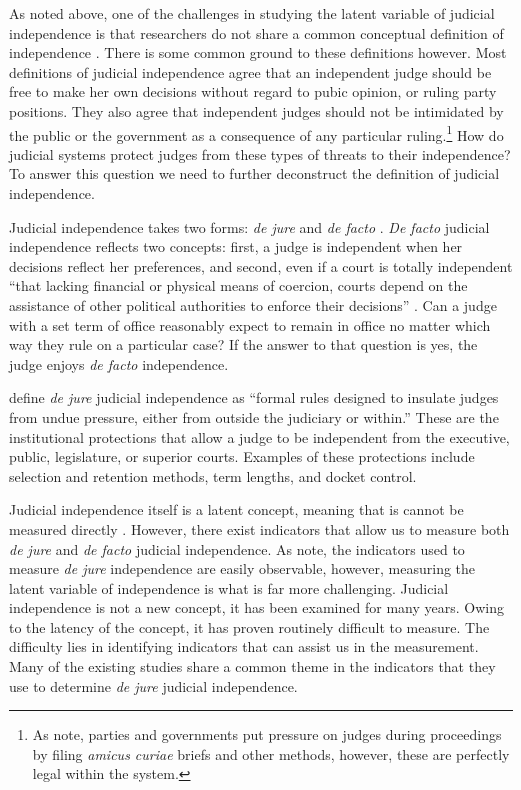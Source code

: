\documentclass[JohnsonMADraft2.tex]{subfiles}
\begin{document}
As noted above, one of the challenges in studying the latent variable of judicial independence is that researchers do not share a common conceptual definition of independence \citep{Linzer2014}.  There is some common ground to these definitions however.  Most definitions of judicial independence agree that an independent judge should be free to make her own decisions without regard to pubic opinion, or ruling party positions.  They also agree that independent judges should not be intimidated by the public or the government as a consequence of any particular ruling.\footnote{As \citet[4]{Rios2014} note, parties and governments put pressure on judges during proceedings by filing \textit{amicus curiae} briefs and other methods, however, these are perfectly legal within the system.}  How do judicial systems protect judges from these types of threats to their independence?  To answer this question we need to further deconstruct the definition of judicial independence. 

Judicial independence takes two forms: \textit{de jure} and \textit{de facto} \citep{Feld2003,Rios2014, Rosenberg1991,Voeten2008}.  \textit{De facto} judicial independence reflects two concepts: first, a judge is independent when her decisions reflect her preferences, and second, even if a court is totally independent ``that lacking financial or physical means of coercion, courts depend on the assistance of other political authorities to enforce their decisions'' \citep[4]{Rios2014}. Can a judge with a set term of office reasonably expect to remain in office no matter which way they rule on a particular case? If the answer to that question is yes, the judge enjoys \textit{de facto} independence. 

\citet[3]{Rios2014} define \textit{de jure} judicial independence as ``formal rules designed to insulate judges from undue pressure, either from outside the judiciary or within.''  These are the institutional protections that allow a judge to be independent from the executive, public, legislature, or superior courts.  Examples of these protections include selection and retention methods, term lengths, and docket control.

Judicial independence itself is a latent concept, meaning that is cannot be measured directly \citep[203]{Treier2008}.  However, there exist indicators that allow us to measure both \textit{de jure} and \textit{de facto} judicial independence.  As \citet[5]{Rios2014} note, the indicators used to measure \textit{de jure} independence are easily observable, however, measuring the latent variable of independence is what is far more challenging.  Judicial independence is not a new concept, it has been examined for many years.  Owing to the latency of the concept, it has proven routinely difficult to measure.  The difficulty lies in identifying indicators that can assist us in the measurement.  Many of the existing studies share a common theme in the indicators that they use to determine \textit{de jure} judicial independence.  
\end{document}
